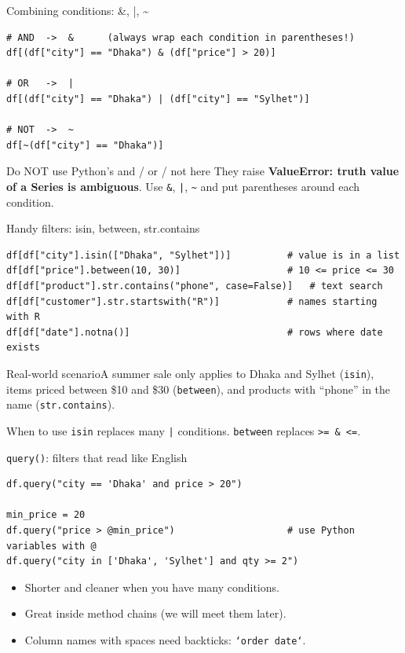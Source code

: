 \documentclass[aspectratio=169,10pt]{beamer}
\newcommand{\code}[1]{\texttt{#1}}
\newcommand{\scenario}[1]{\begin{exampleblock}{Real-world scenario}#1\end{exampleblock}}
\begin{document}
\begin{frame}[fragile]{Combining conditions: \&, |, \~{}}
\begin{lstlisting}
# AND  ->  &      (always wrap each condition in parentheses!)
df[(df["city"] == "Dhaka") & (df["price"] > 20)]

# OR   ->  |
df[(df["city"] == "Dhaka") | (df["city"] == "Sylhet")]

# NOT  ->  ~
df[~(df["city"] == "Dhaka")]
\end{lstlisting}
  \begin{alertblock}{Do NOT use Python's and / or / not here}
    They raise \textbf{ValueError: truth value of a Series is ambiguous}. Use \code{\&},
    \code{|}, \code{\~{}} and put parentheses around each condition.
  \end{alertblock}
\end{frame}

\begin{frame}[fragile]{Handy filters: isin, between, str.contains}
\begin{lstlisting}
df[df["city"].isin(["Dhaka", "Sylhet"])]          # value is in a list
df[df["price"].between(10, 30)]                   # 10 <= price <= 30
df[df["product"].str.contains("phone", case=False)]   # text search
df[df["customer"].str.startswith("R")]            # names starting with R
df[df["date"].notna()]                            # rows where date exists
\end{lstlisting}
  \scenario{A summer sale only applies to Dhaka and Sylhet (\code{isin}), items priced
  between \$10 and \$30 (\code{between}), and products with ``phone'' in the name
  (\code{str.contains}).}
  \begin{block}{When to use}
    \code{isin} replaces many \code{|} conditions. \code{between} replaces \code{>= \& <=}.
  \end{block}
\end{frame}

\begin{frame}[fragile]{\texttt{query()}: filters that read like English}
\begin{lstlisting}
df.query("city == 'Dhaka' and price > 20")

min_price = 20
df.query("price > @min_price")                    # use Python variables with @
df.query("city in ['Dhaka', 'Sylhet'] and qty >= 2")
\end{lstlisting}
  \begin{itemize}
    \item Shorter and cleaner when you have many conditions.
    \item Great inside \alert{method chains} (we will meet them later).
    \item Column names with spaces need backticks: \code{`order date`}.
  \end{itemize}
\end{frame}
\end{document}
